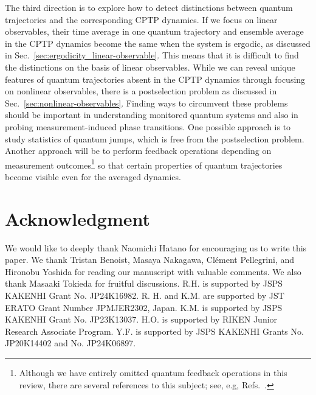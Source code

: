 \documentclass[preprint,pteplogo]{ptephy_v2}%
\numberwithin{equation}{section}
\theoremstyle{definition}
\begin{document}
The third direction is to explore how to detect distinctions between quantum trajectories and the corresponding CPTP dynamics. 
If we focus on linear observables, their time average in one quantum trajectory and ensemble average in the CPTP dynamics become the same when the system is ergodic, as discussed in Sec.~\ref{sec:ergodicity_linear-observable}.
This means that it is difficult to find the distinctions on the basis of linear observables.
While we can reveal unique features of quantum trajectories absent in the CPTP dynamics through focusing on nonlinear observables, there is a postselection problem as discussed in Sec.~\ref{sec:nonlinear-observables}.
Finding ways to circumvent these problems should be important in understanding monitored quantum systems and also in probing measurement-induced phase transitions. 
One possible approach is to study statistics of quantum jumps, which is free from the postselection problem. 
Another approach will be to perform feedback operations depending on measurement outcomes\footnote{
Although we have entirely omitted quantum feedback operations in this review, there are several references to this subject; see, e.g, Refs.~\cite{wiseman2009quantum, Dong2010quantum, JingZhang2017quantum, Dong2022quantum, landi2024current, Berberich2024quantum}.
} so that certain properties of quantum trajectories become visible even for the averaged dynamics.

\section*{Acknowledgment}
We would like to deeply thank Naomichi Hatano for encouraging us to write this paper. 
We thank Tristan Benoist, Masaya Nakagawa, Clément Pellegrini, and Hironobu Yoshida for reading our manuscript with valuable comments. 
We also thank Masaaki Tokieda for fruitful discussions. 
R.H. is supported by JSPS KAKENHI Grant No. JP24K16982. 
R. H. and K.M. are supported by JST ERATO Grant Number JPMJER2302, Japan. 
K.M. is supported by JSPS KAKENHI Grant No. JP23K13037. 
H.O. is supported by RIKEN Junior Research Associate Program. 
Y.F. is supported by JSPS KAKENHI Grants No. JP20K14402 and No. JP24K06897.  
\end{document}
